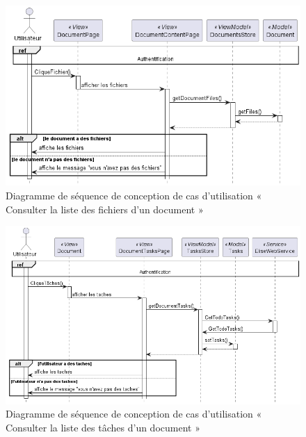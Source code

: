 \begin{figure}[H]
  \centering
  \includegraphics[width=1\textwidth]{out/diagrams/documents/sequence_preview_files/sequence_preview_files}
  \caption{Diagramme de séquence de conception de cas d'utilisation « Consulter la liste des fichiers d'un document »}
  \label{fig:sequence_conception_previewFiles}
\end{figure}
\begin{figure}[H]
  \centering
  \includegraphics[width=1\textwidth]{out/diagrams/documents/sequence_preview_tasks/sequence_preview_tasks}
  \caption{Diagramme de séquence de conception de cas d'utilisation « Consulter la liste des tâches d'un document »}
  \label{fig:sequence_conception_previewTasks}
\end{figure}
